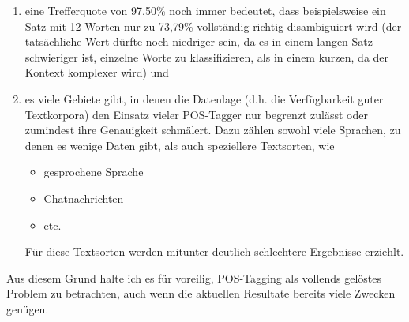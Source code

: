 \documentclass{article}
\begin{document}
\begin{enumerate}[noitemsep,topsep=\mdcompacttopsep]%

\item{}eine Trefferquote von 97,50\% noch immer bedeutet, dass beispielsweise ein Satz mit 12 Worten nur zu 73,79\% vollständig richtig disambiguiert wird (der tatsächliche Wert dürfte noch niedriger sein, da es in einem langen Satz schwieriger ist, einzelne Worte zu klassifizieren, als in einem kurzen, da der Kontext komplexer wird) und%

\item{}es viele Gebiete gibt, in denen die Datenlage (d.h. die Verfügbarkeit guter Textkorpora) den Einsatz vieler POS-Tagger nur begrenzt zulässt oder zumindest ihre Genauigkeit schmälert. Dazu zählen sowohl viele Sprachen, zu denen es wenige Daten gibt, als auch speziellere Textsorten, wie 

\begin{itemize}[noitemsep,topsep=\mdcompacttopsep]%

\item{}gesprochene Sprache%

\item{}Chatnachrichten%

\item{}etc.%
\end{itemize}%
Für diese Textsorten werden mitunter deutlich schlechtere Ergebnisse erziehlt.%
\end{enumerate}%

\noindent{}Aus diesem Grund halte ich es für voreilig, POS-Tagging als vollends gelöstes Problem zu betrachten, auch wenn die aktuellen Resultate bereits viele Zwecken genügen.%
\end{document}
